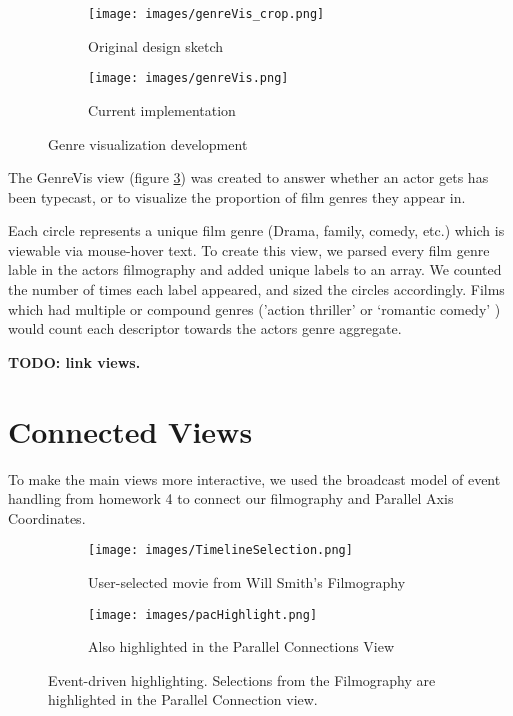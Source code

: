 \documentclass[12pt]{article}
\begin{document}
	\begin{figure}[h!]
		\centering
		\begin{subfigure}[t]{.5\textwidth}
		  \centering
		  \texttt{[image: images/genreVis\_crop.png]}
		  \caption{Original design sketch}
		  \label{fig:sub1}
		\end{subfigure}%
		\begin{subfigure}[t]{.8\textwidth}
		  \centering
		  \texttt{[image: images/genreVis.png]}
		  \caption{Current implementation}
		  \label{fig:sub2}
		\end{subfigure}%
		\caption{Genre visualization development}
		\label{fig:genreVis}
	\end{figure}

	
The GenreVis view (figure \ref{fig:genreVis}) was created to answer whether  an actor gets has been typecast, or to visualize the proportion of film genres they appear in.  

Each circle represents a unique film genre (Drama, family, comedy, etc.) which is viewable via mouse-hover text.  To create this view, we parsed every film genre lable in the actors filmography and added unique labels to an array.  We counted the number of times each label appeared, and sized the circles accordingly.  Films which had multiple or compound genres ('action thriller' or `romantic comedy' ) would count each descriptor towards the actors genre aggregate.


\textbf{TODO: link views.}

\newpage


\section{Connected Views}

To make the main views more interactive, we used the broadcast model of event handling from homework 4 to connect our filmography and Parallel Axis Coordinates.


	\begin{figure}[h!]
		\centering
		\begin{subfigure}[t]{.5\textwidth}
		  \centering
		  \texttt{[image: images/TimelineSelection.png]}
		  \caption{User-selected movie from Will Smith's Filmography}
		  \label{fig:sub1}
		\end{subfigure}%
		\begin{subfigure}[t]{.8\textwidth}
		  \centering
		  \texttt{[image: images/pacHighlight.png]}
		  \caption{Also highlighted in the Parallel Connections View}
		  \label{fig:sub2}
		\end{subfigure}%
		\caption{Event-driven highlighting.  Selections from the Filmography are highlighted in the Parallel Connection view.}
		\label{fig:filmToParallelHighlight}
	\end{figure}
\end{document}
